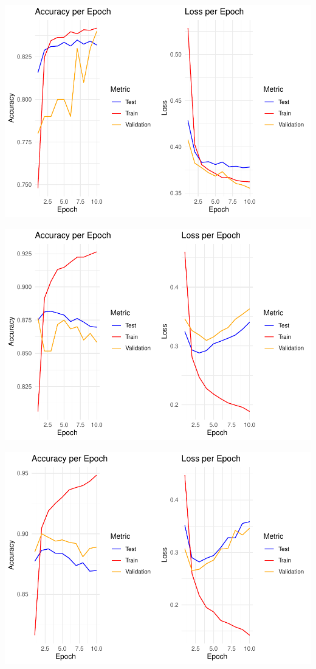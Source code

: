 \documentclass[
]{article}
\begin{document}
\includegraphics{A4_files/figure-latex/unnamed-chunk-22-1.pdf}

\includegraphics{A4_files/figure-latex/unnamed-chunk-23-1.pdf}

\includegraphics{A4_files/figure-latex/unnamed-chunk-24-1.pdf}
\end{document}
